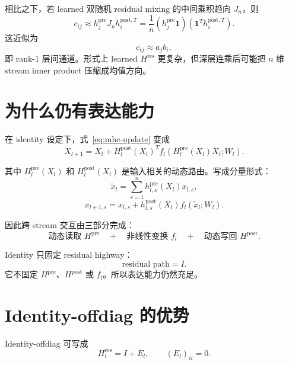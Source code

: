 \documentclass[UTF8,11pt]{ctexart}
\newcommand{\one}{\mathbf{1}}
\newcommand{\J}{J_n}
\newcommand{\Hres}{H^{\mathrm{res}}}
\newcommand{\Hpre}{H^{\mathrm{pre}}}
\newcommand{\Hpost}{H^{\mathrm{post}}}
\begin{document}
相比之下，若 learned 双随机 residual mixing 的中间乘积趋向 $\J$，则
\begin{equation}
  c_{ij}
  \approx
  h_j^{\mathrm{pre}}\J h_i^{\mathrm{post},T}
  =
  \frac{1}{n}
  (h_j^{\mathrm{pre}}\one)
  (\one^T h_i^{\mathrm{post},T}).
\end{equation}
这近似为
\begin{equation}
  c_{ij}\approx a_jb_i,
\end{equation}
即 rank-$1$ 层间通道。形式上 learned $\Hres$ 更复杂，但深层连乘后可能把 $n$ 维 stream inner product 压缩成均值方向。

\section{为什么仍有表达能力}

在 identity 设定下，式~\eqref{eq:mhc-update} 变成
\begin{equation}
  X_{l+1}
  =
  X_l
  +
  \Hpost_l(X_l)^T
  f_l\!\left(\Hpre_l(X_l)X_l;W_l\right).
\end{equation}

其中 $\Hpre_l(X_l)$ 和 $\Hpost_l(X_l)$ 是输入相关的动态路由。写成分量形式：
\begin{equation}
  \tilde{x}_l
  =
  \sum_{s=1}^n h_{l,s}^{\mathrm{pre}}(X_l)x_{l,s},
\end{equation}
\begin{equation}
  x_{l+1,s}
  =
  x_{l,s}
  +
  h_{l,s}^{\mathrm{post}}(X_l) f_l(\tilde{x}_l;W_l).
\end{equation}

因此跨 stream 交互由三部分完成：
\begin{equation}
  \text{动态读取 } \Hpre
  \quad + \quad
  \text{非线性变换 } f_l
  \quad + \quad
  \text{动态写回 } \Hpost.
\end{equation}

Identity 只固定 residual highway：
\begin{equation}
  \text{residual path}=I.
\end{equation}
它不固定 $\Hpre$、$\Hpost$ 或 $f_l$。所以表达能力仍然充足。

\section{Identity-offdiag 的优势}

Identity-offdiag 可写成
\begin{equation}
  \Hres_l=I+E_l,
  \qquad
  (E_l)_{ii}=0.
\end{equation}
\end{document}
